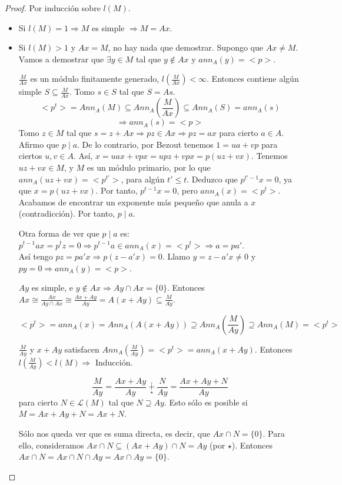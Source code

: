 \documentclass[11pt,a4paper]{article}
\theoremstyle{break}
\begin{document}
\begin{proof}
Por inducción sobre $l(M)$.
\begin{itemize}
\item Si $l(M) = 1 \Rightarrow M$ es simple $\Rightarrow M = Ax$.
\item Si $l(M) > 1$ y $Ax = M$, no hay nada que demostrar. Supongo que $Ax \neq M$. \\
Vamos a demostrar que $\exists y \in M$ tal que $y \notin Ax$ y $ann_{A}(y) = <p>$.

$\frac{M}{Ax}$ es un módulo finitamente generado, $l(\frac{M}{Ax}) < \infty$. Entonces contiene algún simple $S \subseteq \frac{M}{Ax}$. Tomo $s \in S$ tal que $S = As$.
$$<p^{t}> = Ann_{A}(M) \subseteq Ann_{A}(\frac{M}{Ax}) \subseteq Ann_{A}(S) = ann_{A}(s)$$
$$\Rightarrow ann_{A}(s) = <p>$$
Tomo $z \in M$ tal que $s = z + Ax \Rightarrow pz \in Ax \Rightarrow pz = ax$ para cierto $a \in A$. Afirmo que $p \mid a$. De lo contrario, por Bezout tenemos $1 = ua + vp$ para ciertos $u, v \in A$. Así, $x = uax + vpx = upz + vpx = p(uz + vx)$. Tenemos $uz + vx \in M$, y $M$ es un módulo primario, por lo que $ann_{A}(uz + vx) = <p^{t'}>$, para algún $t' \leq t$. Deduzco que $p^{t'-1}x = 0$, ya que $x = p(uz + vx)$. Por tanto, $p^{t-1}x = 0$, pero $ann_{A}(x) = <p^{t}>$. Acabamos de encontrar un exponente más pequeño que anula a $x$ (contradicción). Por tanto, $p \mid a$.


Otra forma de ver que $p \mid a$ es: $p^{t-1}ax = p^{t}z = 0 \Rightarrow p^{t-1}a \in ann_{A}(x) = <p^{t}> \Rightarrow a = pa'$. \\
Así tengo $pz = pa'x \Rightarrow p(z - a'x) = 0$. Llamo $y = z-a'x \neq 0$ y $py = 0 \Rightarrow ann_{A}(y) = <p>$.

$Ay$ es simple, e $y \notin Ax \Rightarrow Ay \cap Ax = \{0\}$. Entonces $Ax \cong \frac{Ax}{Ay \cap Ax} \cong \frac{Ax + Ay}{Ay} = A(x + Ay) \subseteq \frac{M}{Ay}$.
\begin{scriptsize}
$$<p^{t}> = ann_{A}(x) = Ann_{A}(A(x + Ay)) \supseteq Ann_{A}(\frac{M}{Ay}) \supseteq Ann_{A}(M) = <p^{t}>$$
\end{scriptsize}
$\frac{M}{Ay}$ y $x + Ay$ satisfacen $Ann_{A}(\frac{M}{Ay}) = <p^{t}> = ann_{A}(x + Ay)$. Entonces $l(\frac{M}{Ay}) < l(M) \Rightarrow$ Inducción.

$$\frac{M}{Ay} = \frac{Ax + Ay}{Ay} \underset{\star}{\dotplus} \frac{N}{Ay} = \frac{Ax + Ay + N}{Ay}$$
para cierto $N \in \mathcal{L}(M)$ tal que $N \supseteq Ay$. Esto sólo es posible si $M = Ax + Ay + N = Ax + N$.

Sólo nos queda ver que es suma directa, es decir, que $Ax \cap N = \{0\}$. Para ello, consideramos $Ax \cap N \subseteq (Ax + Ay) \cap N = Ay$ (por $\star$). Entonces $Ax \cap N = Ax \cap N \cap Ay = Ax \cap Ay = \{0\}$.
\end{itemize}
\end{proof}
\end{document}
